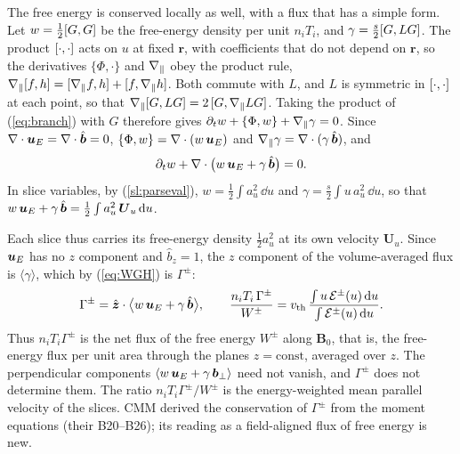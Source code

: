The free energy is conserved locally as well, with a flux that has a simple form. Let $w=\tfrac12[G,G]$ be the free-energy density per unit $n_iT_i$, and $\gamma=\tfrac{s}{2}[G,LG]$. The product $[\cdot,\cdot]$ acts on $u$ at fixed $\boldsymbol r$, with coefficients that do not depend on $\boldsymbol r$, so the derivatives $\{\Phi,\cdot\}$ and $\nabla_\parallel$ obey the product rule, $\nabla_\parallel[f,h]=[\nabla_\parallel f,h]+[f,\nabla_\parallel h]$. Both commute with $L$, and $L$ is symmetric in $[\cdot,\cdot]$ at each point, so that $\nabla_\parallel[G,LG]=2\,[G,\nabla_\parallel LG]$. Taking the product of (\ref{eq:branch}) with $G$ therefore gives $\partial_tw+\{\Phi,w\}+\nabla_\parallel\gamma=0$. Since $\nabla\cdot\boldsymbol u_E=\nabla\cdot\hat{\boldsymbol b}=0$, $\{\Phi,w\}=\nabla\cdot(w\,\boldsymbol u_E)$ and $\nabla_\parallel\gamma=\nabla\cdot(\gamma\,\hat{\boldsymbol b})$, and
\begin{equation}\label{eq:localflux}
  \partial_tw+\nabla\cdot\big(w\,\boldsymbol u_E+\gamma\,\hat{\boldsymbol b}\big)=0 .
\end{equation}
In slice variables, by (\ref{sl:parseval}), $w=\tfrac12\int a_u^2\,\dd u$ and $\gamma=\tfrac{s}{2}\int u\,a_u^2\,\dd u$, so that $w\,\boldsymbol u_E+\gamma\,\hat{\boldsymbol b}=\tfrac12\int a_u^2\,\boldsymbol U_u\,\mathrm{d} u$.

Each slice thus carries its free-energy density $\tfrac12a_u^2$ at its own velocity $\boldsymbol U_u$. Since $\boldsymbol u_E$ has no $z$ component and $\hat b_z=1$, the $z$ component of the volume-averaged flux is $\langle\gamma\rangle$, which by (\ref{eq:WGH}) is $\Gamma^\pm$:
\begin{equation}\label{eq:Gammaflux}
  \Gamma^\pm=\hat{\boldsymbol z}\cdot\big\langle w\,\boldsymbol u_E+\gamma\,\hat{\boldsymbol b}\big\rangle,\qquad
  \frac{n_iT_i\,\Gamma^\pm}{W^\pm}=v_{\mathrm{th}}\,\frac{\int u\,\mathcal E^\pm(u)\,\mathrm{d} u}{\int\mathcal E^\pm(u)\,\mathrm{d} u}.
\end{equation}
Thus $n_iT_i\Gamma^\pm$ is the net flux of the free energy $W^\pm$ along $\boldsymbol B_0$, that is, the free-energy flux per unit area through the planes $z=\mathrm{const}$, averaged over $z$. The perpendicular components $\langle w\,\boldsymbol u_E+\gamma\,\boldsymbol b_\perp\rangle$ need not vanish, and $\Gamma^\pm$ does not determine them. The ratio $n_iT_i\Gamma^\pm/W^\pm$ is the energy-weighted mean parallel velocity of the slices. CMM derived the conservation of $\Gamma^\pm$ from the moment equations (their B20--B26); its reading as a field-aligned flux of free energy is new.
